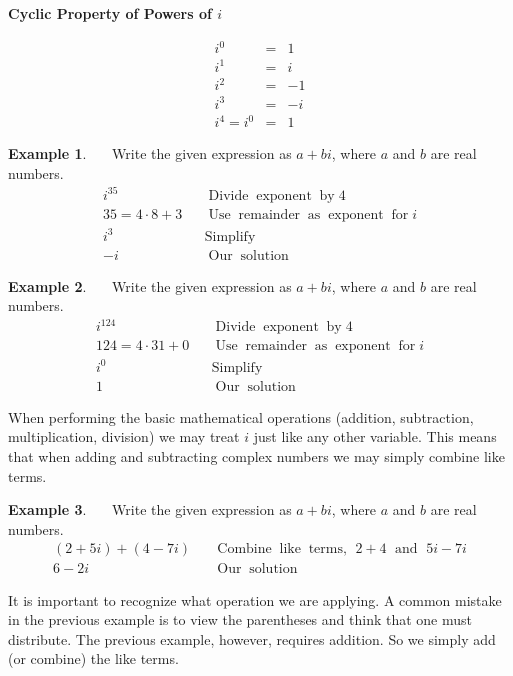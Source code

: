 \documentclass[12pt]{book}
\theoremstyle{definition}
\newtheorem{example}{Example}
\newcommand{\tmop}[1]{\ensuremath{\operatorname{#1}}}
\begin{document}
\begin{center}
  {\bf Cyclic Property of Powers of $i$}
\end{center}
\[ \begin{array}{rcc}
     i^0 &=& 1\\
     i^1 &=& i\\
     i^2 &=& - 1\\
     i^3 &=& - i\\
		 i^4=i^0&=&1
   \end{array} \]
\begin{example}~~~Write the given expression as $a+bi$, where $a$ and $b$ are real numbers.
  \begin{eqnarray*}
    i^{35} &  & \tmop{Divide} \tmop{exponent} \tmop{by} 4\\
    35=4\cdot 8+3 &  & \tmop{Use} \tmop{remainder} \tmop{as} \tmop{exponent} \tmop{for}
    i\\
    i^3 &  & \tmop{Simplify}\\
    - i &  & \tmop{Our} \tmop{solution}
  \end{eqnarray*}
\end{example}
\begin{example}~~~Write the given expression as $a+bi$, where $a$ and $b$ are real numbers.
  \begin{eqnarray*}
    i^{124} &  & \tmop{Divide} \tmop{exponent} \tmop{by} 4\\
    124=4\cdot 31+0 &  & \tmop{Use} \tmop{remainder} \tmop{as} \tmop{exponent}
    \tmop{for} i\\
    i^0 &  & \tmop{Simplify}\\
    1 &  & \tmop{Our} \tmop{solution}
  \end{eqnarray*}
\end{example}
When performing the basic mathematical operations (addition, subtraction, multiplication, division) we may treat $i$ just like any other variable. This means that when adding and subtracting complex numbers we may simply combine like terms.
\begin{example}~~~Write the given expression as $a+bi$, where $a$ and $b$ are real numbers.
  \begin{eqnarray*}
    (2 + 5 i) + (4 - 7 i) &  & \tmop{Combine} \tmop{like} \tmop{terms,~} 2 + 4
    \tmop{~and~} 5 i - 7 i\\
    6 - 2 i &  & \tmop{Our} \tmop{solution}
  \end{eqnarray*}
\end{example}
It is important to recognize what operation we are applying. A common mistake in the previous example is to view the parentheses and think that one must distribute.  The previous example, however, requires addition.  So we simply add (or combine) the like terms.\par
\end{document}
